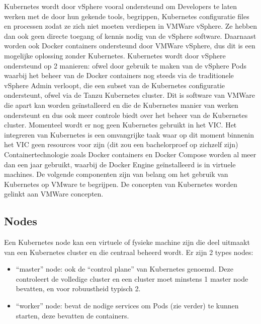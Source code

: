 \newline
\newline
Kubernetes wordt door vSphere vooral ondersteund om Developers te laten werken met de door hun gekende tools, begrippen, Kubernetes configuratie files en processen zodat ze zich niet moeten verdiepen in VMWare vSphere. Ze hebben dan ook geen directe toegang of kennis nodig van de vSphere software.\autocite{VMware2019}
\newline
\newline
Daarnaast worden ook Docker containers ondersteund door VMWare vSphere, dus dit is een mogelijke oplossing zonder Kubernetes.
\newline
\newline
Kubernetes wordt door vSphere ondersteund op 2 manieren: ofwel door gebruik te maken van de vSphere Pods waarbij het beheer van de Docker containers nog steeds via de traditionele vSphere Admin verloopt, die een subset van de Kubernetes configuratie ondersteunt, ofwel via de Tanzu Kubernetes cluster. Dit is software van VMWare die apart kan worden geïnstalleerd en die de Kubernetes manier van werken ondersteunt en dus ook meer controle biedt over het beheer van de Kubernetes cluster.
\newline
\newline
Momenteel wordt er nog geen Kubernetes gebruikt in het VIC. Het integreren van Kubernetes is een omvangrijke taak waar op dit moment binnenin het VIC geen resources voor zijn (dit zou een bachelorproef op zichzelf zijn)
\newline
Containertechnologie zoals Docker containers en Docker Compose worden al meer dan een jaar gebruikt, waarbij de Docker Engine geïnstalleerd is in virtuele machines.
\newline
\newline
De volgende componenten zijn van belang om het gebruik van Kubernetes op VMware te begrijpen. De concepten van Kubernetes worden gelinkt aan VMWare concepten.
\newline
\newline
\subsection{Nodes}
Een Kubernetes node kan een virtuele of fysieke machine zijn die deel uitmaakt van een Kubernetes cluster en die centraal beheerd wordt.
Er zijn 2 types nodes:
\begin{itemize}
    \item ``master'' node: ook de ``control plane'' van Kubernetes genoemd. Deze controleert de volledige cluster en een cluster moet minstens 1 master node bevatten, en voor robuustheid typisch 2.
    \item ``worker'' node: bevat de nodige services om Pods (zie verder) te kunnen starten, deze bevatten de containers.
\end{itemize}
\autocite{NirShtein2023}
